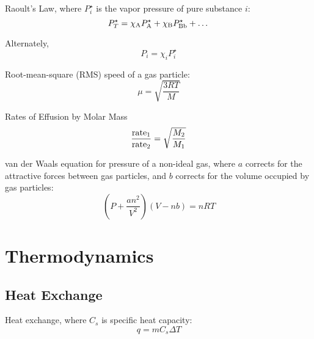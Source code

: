 \documentclass[10pt]{article}
\begin{document}
Raoult's Law, where $P_i^\star$ is the vapor pressure of pure substance $i$:
\begin{equation*}
P_T^\star=\chi_\textnormal{A}P_\textnormal{A}^\star + \chi_\textnormal{B}P_\textnormal{Bb}^\star + \dots
\end{equation*}

Alternately,
\begin{equation*}
P_i=\chi_iP_i^\star
\end{equation*}

Root-mean-square (RMS) speed of a gas particle:
\begin{equation*}
\mu = \sqrt{\frac{3RT}{M}}
\end{equation*}

Rates of Effusion by Molar Mass
\begin{equation*}
\frac{\textnormal{rate}_1}{\textnormal{rate}_2} = \sqrt{\frac{M_2}{M_1}}
\end{equation*}

van der Waals equation for pressure of a non-ideal gas, where $a$ corrects for the attractive forces between gas particles, and $b$ corrects for the volume occupied by gas particles:
\begin{equation*}
\left(P+\frac{an^2}{V^2}\right)(V-nb)=nRT
\end{equation*}


\section{Thermodynamics}


\subsection{Heat Exchange}

Heat exchange, where $C_s$ is specific heat capacity:
\begin{equation*}
q=mC_s\Delta T
\end{equation*}
\end{document}
